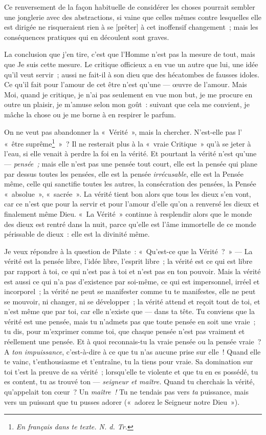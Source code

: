 \documentclass[french,twoside]{book} %
\newcommand\corr[1]{#1}
\begin{document}
Ce renversement de la façon habituelle de considérer les choses pourrait sembler une jonglerie avec des abstractions, si vaine que celles mêmes contre lesquelles elle est dirigée ne risqueraient rien à se [{\corr prêter}] à cet inoffensif changement ; mais les conséquences pratiques qui en découlent sont graves.\par
La conclusion que j’en tire, c’est que l’Homme n’est pas la mesure de tout, mais que Je suis cette mesure. Le critique officieux a en vue un autre que lui, une idée qu’il veut servir ; aussi ne fait-il à son dieu que des hécatombes de fausses idoles. Ce qu’il fait pour l’amour de cet être n’est qu’une — œuvre de l’amour. Mais Moi, quand je critique, je n’ai pas seulement en vue mon but, je me procure en outre un plaisir, je m’amuse selon mon goût : suivant que cela me convient, je mâche la chose ou je me borne à en respirer le parfum.\par
On ne veut pas abandonner la « Vérité », mais la chercher. N’est-elle pas l’ « être suprême\footnote{ \noindent \emph{En français dans te texte. N. d. Tr.}
 } » ? Il ne resterait plus à la « vraie Critique » qu’à se jeter à l’eau, si elle venait à perdre la foi en la vérité. Et pourtant la vérité n’est qu’une — \emph{pensée ;} mais elle n’est pas une pensée tout court, elle est la pensée qui plane par dessus toutes les pensées, elle est la pensée \emph{irrécusable}, elle est la Pensée même, celle qui sanctifie toutes les autres, la consécration des pensées, la Pensée « absolue », « sacrée ». La vérité tient bon alors que tous les dieux s’en vont, car ce n’est que pour la servir et pour l’amour d’elle qu’on a renversé les dieux et finalement même Dieu. « La Vérité » continue à resplendir alors que le monde des dieux est rentré dans la nuit, parce qu’elle est l’âme immortelle  de ce monde périssable de dieux : elle est la divinité même.\par
Je veux répondre à la question de Pilate : « Qu’est-ce que la Vérité ? » — La vérité est la pensée libre, l’idée libre, l’esprit libre ; la vérité est ce qui est libre par rapport à toi, ce qui n’est pas à toi et n’est pas en ton pouvoir. Mais la vérité est aussi ce qui n’a pas d’existence par soi-même, ce qui est impersonnel, irréel et incorporel ; la vérité ne peut se manifester comme tu te manifestes, elle ne peut se mouvoir, ni changer, ni se développer ; la vérité attend et reçoit tout de toi, et n’est même que par toi, car elle n’existe que — dans ta tête. Tu conviens que la vérité est une pensée, mais tu n’admets pas que toute pensée en soit une vraie ; tu dis, pour m’exprimer comme toi, que chaque pensée n’est pas vraiment et réellement une pensée. Et à quoi reconnais-tu la vraie pensée ou la pensée vraie ? A \emph{ton impuissance}, c’est-à-dire à ce que tu n’as aucune prise sur elle ! Quand elle te vainc, t’enthousiasme et t’entraîne, tu la tiens pour vraie. Sa domination sur toi t’est la preuve de sa vérité ; lorsqu’elle te violente et que tu en es possédé, tu es content, tu as trouvé ton — \emph{seigneur et maître. }Quand tu cherchais la vérité, qu’appelait ton cœur ? Un \emph{maître !} Tu ne tendais pas vers \emph{ta} puissance, mais vers un puissant que tu pusses adorer (« adorez le Seigneur notre Dieu »).\par
\end{document}
